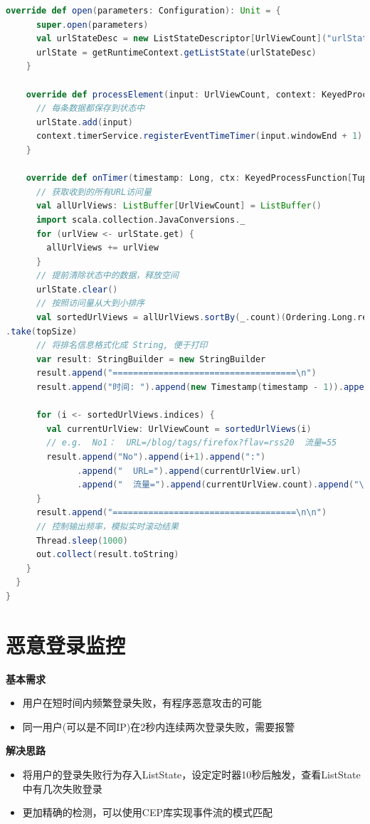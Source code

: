 \documentclass[oneside]{ctexbook}
\begin{document}
\begin{lstlisting}[language=scala, caption=NetworkTrafficAnalysis/src/main/scala/TrafficAnalysis.scala]
    override def open(parameters: Configuration): Unit = {
      super.open(parameters)
      val urlStateDesc = new ListStateDescriptor[UrlViewCount]("urlState-state", classOf[UrlViewCount])
      urlState = getRuntimeContext.getListState(urlStateDesc)
    }

    override def processElement(input: UrlViewCount, context: KeyedProcessFunction[Tuple, UrlViewCount, String]#Context, collector: Collector[String]): Unit = { 
      // 每条数据都保存到状态中
      urlState.add(input)
      context.timerService.registerEventTimeTimer(input.windowEnd + 1)
    }

    override def onTimer(timestamp: Long, ctx: KeyedProcessFunction[Tuple, UrlViewCount, String]#OnTimerContext, out: Collector[String]): Unit = { 
      // 获取收到的所有URL访问量
      val allUrlViews: ListBuffer[UrlViewCount] = ListBuffer()
      import scala.collection.JavaConversions._
      for (urlView <- urlState.get) {
        allUrlViews += urlView
      }
      // 提前清除状态中的数据，释放空间
      urlState.clear()
      // 按照访问量从大到小排序
      val sortedUrlViews = allUrlViews.sortBy(_.count)(Ordering.Long.reverse)
.take(topSize)
      // 将排名信息格式化成 String, 便于打印
      var result: StringBuilder = new StringBuilder
      result.append("====================================\n")
      result.append("时间: ").append(new Timestamp(timestamp - 1)).append("\n")

      for (i <- sortedUrlViews.indices) {
        val currentUrlView: UrlViewCount = sortedUrlViews(i)
        // e.g.  No1：  URL=/blog/tags/firefox?flav=rss20  流量=55
        result.append("No").append(i+1).append(":")
              .append("  URL=").append(currentUrlView.url)
              .append("  流量=").append(currentUrlView.count).append("\n")
      }
      result.append("====================================\n\n")
      // 控制输出频率，模拟实时滚动结果
      Thread.sleep(1000)
      out.collect(result.toString)
    }
  }
}
\end{lstlisting}

\section{恶意登录监控}

\textbf{基本需求}
\begin{itemize}
\item 用户在短时间内频繁登录失败，有程序恶意攻击的可能
\item 同一用户(可以是不同IP)在2秒内连续两次登录失败，需要报警
\end{itemize}
\textbf{解决思路}
\begin{itemize}
\item 将用户的登录失败行为存入ListState，设定定时器10秒后触发，查看ListState中有几次失败登录
\item 更加精确的检测，可以使用CEP库实现事件流的模式匹配
\end{itemize}
\end{document}
